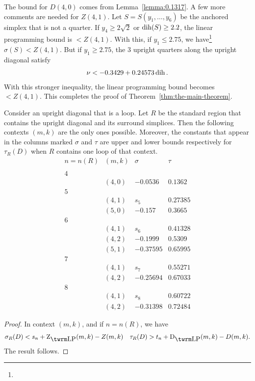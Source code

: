 The bound for $D(4,0)$ comes from Lemma~\ref{lemma:0.1317}. A few
more comments are needed for $Z(4,1)$.  Let $S=S(y_1,\ldots,y_6)$
be the anchored simplex that is not a quarter.  If $y_4\ge2\sqrt2$
or $\operatorname{dih}(S)\ge 2.2$, the linear programming bound is $<Z(4,1)$.
With this, if $y_1\le 2.75$, we have\footnote{} %
    $\sigma(S) < Z(4,1)$.
But if $y_1\ge2.75$, the $3$ upright quarters along the
upright diagonal satisfy
    $$\nu< -0.3429+0.24573\operatorname{dih}.$$
With this stronger inequality, the linear programming bound becomes
$<Z(4,1)$. This completes the proof of
Theorem~\ref{thm:the-main-theorem}.

\begin{lemma}\label{lemma:loop}
Consider an upright diagonal that is a loop.  Let $R$ be the
standard region that contains the upright diagonal and its
surround simplices.   Then the following contexts $(m,k)$ are the
only ones possible.  Moreover, the constants that appear in the
columns marked $\sigma$ and $\tau$ are upper and lower bounds
respectively for $\tau_R(D)$ when $R$ contains one loop of that
context.
    $$
    \begin{array}{llll}
        n=n(R)&(m,k) &\sigma &\tau \\
        &&&\\
        4& & &\\
        &(4,0) &-0.0536 & 0.1362 \\
        5 & & &\\
        &(4,1) &s_5 &0.27385\\
        &(5,0) &-0.157   &0.3665\\
        6 & & &\\
        &(4,1) &s_6 &0.41328\\
        &(4,2) &-0.1999  &0.5309\\
        &(5,1) &-0.37595 &0.65995\\
        7 & & &\\
        &(4,1) &s_7 &0.55271\\
        &(4,2) &-0.25694 &0.67033\\
        8 & & &\\
        &(4,1) &s_8 &0.60722\\
        &(4,2) &-0.31398 &0.72484
    \end{array}
    $$
\end{lemma}

\begin{proof} In context $(m,k)$, and if $n=n(R)$, we have
    $$
    \sigma_R(D) < s_{n} + \ZLP(m,k)-Z(m,k)\quad
    \tau_R(D)> t_{n}+\DLP(m,k)-D(m,k).
    $$
The result follows.
\end{proof}

